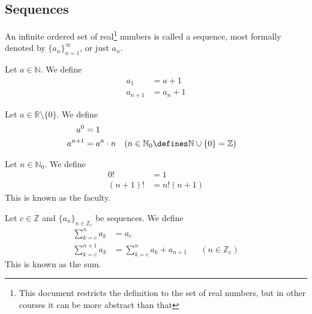 \subsection{Sequences}\label{subsec-sequences}

\begin{definition}\label{def-sequence}
	An infinite ordered set of real\footnote{This document restricts the definition
		to the set of real numbers, but in other courses it can be more abstract than that}
	numbers is called a sequence, most formally denoted by $\{a_n\}_{n=1}^\infty$,
	or just $a_n$.
\end{definition}

\begin{definition}\label{def-sequence-recursive:1}
	Let $a\in\mathbb{N}$. We define \cite[p.51]{wuest2009}
	\begin{align*}
		a_1     & = a + 1   \\
		a_{n+1} & = a_n + 1
	\end{align*}
\end{definition}

\begin{definition}\label{def-sequence-recursive:2}
	Let $a\in\mathbb{R}\setminus\{0\}$. We define \cite[p.51]{wuest2009}
	\begin{align*}
		a^0     & = 1                                                                         \\
		a^{n+1} & = a^n \cdot n &  & (n\in\mathbb{N}_0\defines\mathbb{N}\cup\{0\}=\mathbb{Z})
	\end{align*}
\end{definition}

\begin{definition}\label{def-sequence-recursive:3}
	Let $n\in\mathbb{N}_0$. We define \cite[p.51]{wuest2009}
	\begin{align*}
		0!     & = 1       \\
		(n+1)! & = n!(n+1)
	\end{align*}
	This is known as the faculty.
\end{definition}

\begin{definition}\label{def-sequence-recursive:4}
	Let $c\in\mathbb{Z}$ and $\{a_n\}_{n\in\mathbb{Z}_c}$ be sequences. We define \cite[p.51]{wuest2009}
	\begin{align*}
		\sum_{k=c}^n a_k     & = a_c                                                \\
		\sum_{k=c}^{n+1} a_k & = \sum_{k=c}^n a_k + a_{n+1} &  & (n\in\mathbb{Z}_c)
	\end{align*}
	This is known as the sum.
\end{definition}

